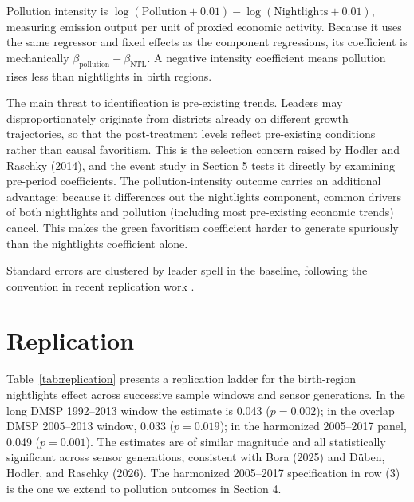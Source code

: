 \documentclass[9pt,twocolumn,twoside]{pnas-new}
\begin{document}
Pollution intensity is $\log(\text{Pollution}+0.01) - \log(\text{Nightlights}+0.01)$, measuring emission output per unit of proxied economic activity. Because it uses the same regressor and fixed effects as the component regressions, its coefficient is mechanically $\beta_{\text{pollution}} - \beta_{\text{NTL}}$. A negative intensity coefficient means pollution rises less than nightlights in birth regions.

The main threat to identification is pre-existing trends. Leaders may disproportionately originate from districts already on different growth trajectories, so that the post-treatment levels reflect pre-existing conditions rather than causal favoritism. This is the selection concern raised by Hodler and Raschky (2014), and the event study in Section 5 tests it directly by examining pre-period coefficients. The pollution-intensity outcome carries an additional advantage: because it differences out the nightlights component, common drivers of both nightlights and pollution (including most pre-existing economic trends) cancel. This makes the green favoritism coefficient harder to generate spuriously than the nightlights coefficient alone.

Standard errors are clustered by leader spell in the baseline, following the convention in recent replication work \cite{Bora2025}.

\section{Replication}

Table~\ref{tab:replication} presents a replication ladder for the birth-region nightlights effect across successive sample windows and sensor generations. In the long DMSP 1992--2013 window the estimate is 0.043 ($p = 0.002$); in the overlap DMSP 2005--2013 window, 0.033 ($p = 0.019$); in the harmonized 2005--2017 panel, 0.049 ($p = 0.001$). The estimates are of similar magnitude and all statistically significant across sensor generations, consistent with Bora (2025) and D\"{u}ben, Hodler, and Raschky (2026). The harmonized 2005--2017 specification in row (3) is the one we extend to pollution outcomes in Section 4.
\end{document}
